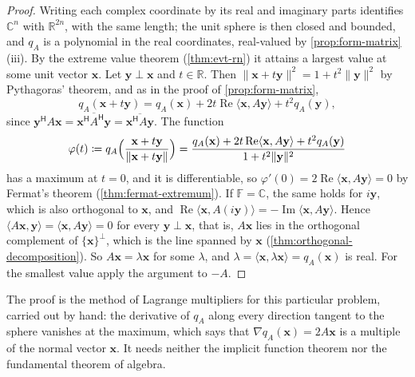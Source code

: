 \begin{proof}
Writing each complex coordinate by its real and imaginary parts identifies $\mathbb C^n$ with $\mathbb R^{2n}$, with the same length; the unit sphere is then closed and bounded, and $q_A$ is a polynomial in the real coordinates, real-valued by \cref{prop:form-matrix}\,(iii). By the extreme value theorem (\cref{thm:evt-rn}) it attains a largest value at some unit vector $\mathbf x$. Let $\mathbf y\perp\mathbf x$ and $t\in\mathbb R$. Then $\|\mathbf x+t\mathbf y\|^2=1+t^2\|\mathbf y\|^2$ by Pythagoras' theorem, and as in the proof of \cref{prop:form-matrix},
\[
q_A(\mathbf x+t\mathbf y)=q_A(\mathbf x)+2t\operatorname{Re}\langle\mathbf x,A\mathbf y\rangle+t^2q_A(\mathbf y),
\]
since $\mathbf y^{\mathsf H}A\mathbf x=\overline{\mathbf x^{\mathsf H}A^{\mathsf H}\mathbf y}=\overline{\mathbf x^{\mathsf H}A\mathbf y}$. The function
\[
\varphi(t)\coloneqq q_A\Bigl(\frac{\mathbf x+t\mathbf y}{\|\mathbf x+t\mathbf y\|}\Bigr)=\frac{q_A(\mathbf x)+2t\operatorname{Re}\langle\mathbf x,A\mathbf y\rangle+t^2q_A(\mathbf y)}{1+t^2\|\mathbf y\|^2}
\]
has a maximum at $t=0$, and it is differentiable, so $\varphi'(0)=2\operatorname{Re}\langle\mathbf x,A\mathbf y\rangle=0$ by Fermat's theorem (\cref{thm:fermat-extremum}). If $\mathbb F=\mathbb C$, the same holds for $i\mathbf y$, which is also orthogonal to $\mathbf x$, and $\operatorname{Re}\langle\mathbf x,A(i\mathbf y)\rangle=-\operatorname{Im}\langle\mathbf x,A\mathbf y\rangle$. Hence $\langle A\mathbf x,\mathbf y\rangle=\langle\mathbf x,A\mathbf y\rangle=0$ for every $\mathbf y\perp\mathbf x$, that is, $A\mathbf x$ lies in the orthogonal complement of $\{\mathbf x\}^\perp$, which is the line spanned by $\mathbf x$ (\cref{thm:orthogonal-decomposition}). So $A\mathbf x=\lambda\mathbf x$ for some $\lambda$, and $\lambda=\langle\mathbf x,\lambda\mathbf x\rangle=q_A(\mathbf x)$ is real. For the smallest value apply the argument to $-A$.
\end{proof}

The proof is the method of Lagrange multipliers for this particular problem, carried out by hand: the derivative of $q_A$ along every direction tangent to the sphere vanishes at the maximum, which says that $\nabla q_A(\mathbf x)=2A\mathbf x$ is a multiple of the normal vector $\mathbf x$. It needs neither the implicit function theorem nor the fundamental theorem of algebra.

